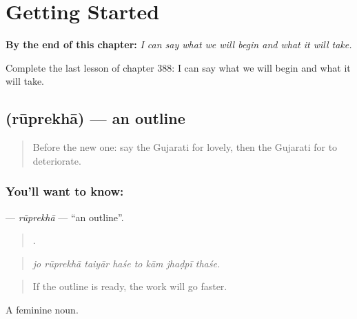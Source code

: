 
\chapter{Getting Started}
\label{ch:gu-getting-started}

\begin{chapteropening}
\textbf{By the end of this chapter:} \emph{I can say what we will begin and what it will take.}

Complete the last lesson of chapter 388: I can say what we will begin and what it will take.
\end{chapteropening}

\section[\texorpdfstring{\gu{રૂપરેખા} (rūprekhā)}{રૂપરેખા (rūprekhā)}]{ (rūprekhā) — an outline}

\label{lesson:GU-C388-ruprekha}



\begin{quote}
Before the new one: say the Gujarati for lovely, then the Gujarati for to deteriorate.
\end{quote}

\subsection*{You'll want to know: }
\textbf{} — \emph{rūprekhā} — \textquotedblleft{}an outline\textquotedblright{}.

\begin{quote}
       .
\end{quote}

\begin{quote}
\emph{jo rūprekhā taiyār haśe to kām jhaḍpī thaśe.}
\end{quote}

\begin{quote}
If the outline is ready, the work will go faster.
\end{quote}

A feminine noun.

